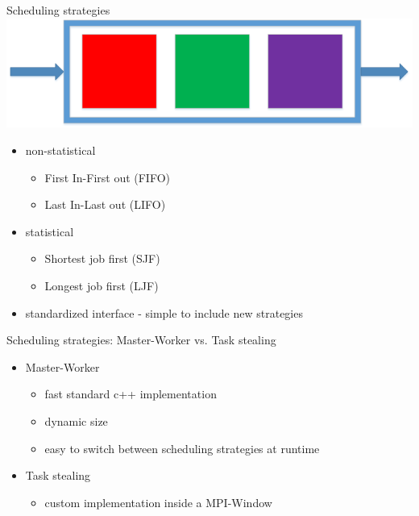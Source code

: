 	\begin{frame}{Scheduling strategies}
		\includegraphics[scale=0.2,right]{images/fifo}
		
		\begin{itemize}
		\item<1-> non-statistical
		\begin{itemize}
			\item First In-First out (FIFO)
			\item Last In-Last out (LIFO)
		\end{itemize}
		\item<2-> statistical
		\begin{itemize}
			\item Shortest job first (SJF)
			\item Longest job first (LJF)
		\end{itemize}
		\item<3-> standardized interface - simple to include new strategies
		\end{itemize}
	\end{frame}
	\begin{frame}{Scheduling strategies: Master-Worker vs. Task stealing}
		\begin{itemize}
			\item<1-> Master-Worker
				\begin{itemize}
					\item fast standard c++ implementation
					\item dynamic size
					\item easy to switch between scheduling strategies at runtime	
				\end{itemize}
			
			\item<2-> Task stealing
					\begin{itemize}
						\item custom implementation inside a MPI-Window
					\end{itemize}
			
		\end{itemize}
	\end{frame}